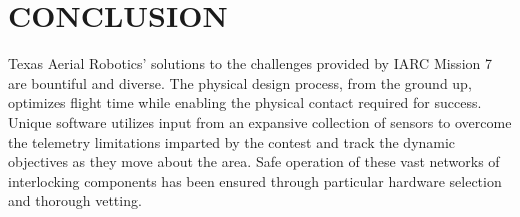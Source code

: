 \documentclass[12pt,letterpaper]{article}
\begin{document}
\section*{CONCLUSION}
	Texas Aerial Robotics' solutions to the challenges provided by IARC Mission 7 are bountiful and diverse. The physical design process, from the ground up, optimizes flight time while enabling the physical contact required for success. Unique software utilizes input from an expansive collection of sensors to overcome the telemetry limitations imparted by the contest and track the dynamic objectives as they move about the area. Safe operation of these vast networks of interlocking components has been ensured through particular hardware selection and thorough vetting.
	\nocite{redmon2016yolo9000}
	\nocite{GitHubSPACEROBOTICS}
	\nocite{HoughTransform}
	\nocite{CannyEdgeDetection}
	
	
\end{document}
